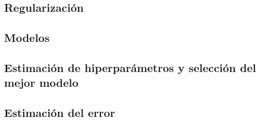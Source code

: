 \documentclass[a4paper, 20pt]{article}
\begin{document}
\subsection{Regularización}

\subsection{Modelos}


\subsection{Estimación de hiperparámetros y selección del mejor modelo}

\subsection{Estimación del error}
\end{document}

